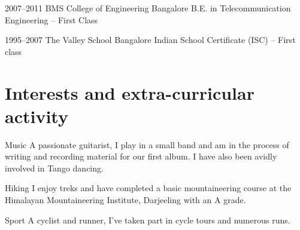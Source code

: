 \documentclass[11pt,a4paper,sans]{moderncv}        %
\begin{document}
\cventry
{\textcolor{light}{2007--2011}}
{BMS College of Engineering}
{Bangalore}
{}
{}
{B.E. in Telecommunication Engineering -- First Class}

\vspace{6pt}

\cventry
{\textcolor{light}{1995--2007}}
{The Valley School}
{Bangalore}
{}
{}
{Indian School Certificate (ISC) -- First class}

\vspace{6pt}

\section{Interests and extra-curricular activity}

\vspace{6pt}

\cvline
{\textcolor{light}{Music}}
{A passionate guitarist, I play in a small band and am in the process of writing and recording material for our first album. I have also been avidly involved in Tango dancing.}

\vspace{6pt}

\cvline
{\textcolor{light}{Hiking}}
{I enjoy treks and have completed a basic mountaineering course at the Himalayan Mountaineering Institute, Darjeeling with an A grade.}

\vspace{6pt}

\cvline
{\textcolor{light}{Sport}}
{A cyclist and runner, I've taken part in cycle tours and numerous runs.}

\vspace{6pt}

\nocite{*}



\end{document}
